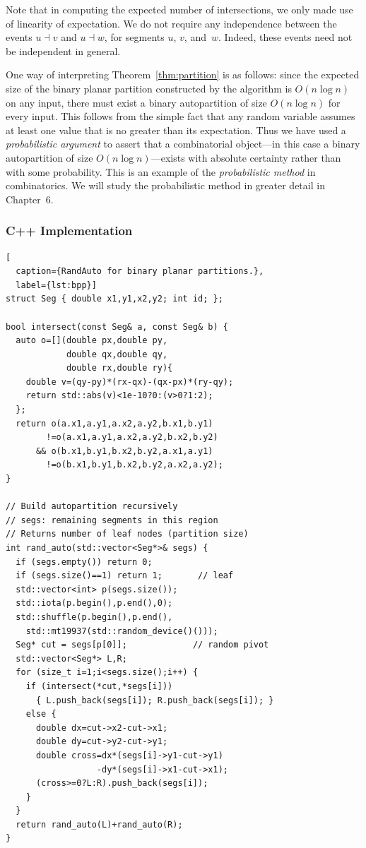 \documentclass[twoside,12pt]{book}
\theoremstyle{plain}
\theoremstyle{definition}
\theoremstyle{remark}
\begin{document}
Note that in computing the expected number of intersections, we only made
use of linearity of expectation.  We do not require any independence between
the events $u\dashv v$ and $u\dashv w$, for segments $u$, $v$, and~$w$.
Indeed, these events need not be independent in general.

One way of interpreting Theorem~\ref{thm:partition} is as follows: since the
expected size of the binary planar partition constructed by the algorithm is
$O(n\log n)$ on any input, there must exist a binary autopartition of size
$O(n\log n)$ for every input.  This follows from the simple fact that any
random variable assumes at least one value that is no greater than its
expectation.  Thus we have used a \emph{probabilistic argument} to assert
that a combinatorial object---in this case a binary autopartition of size
$O(n\log n)$---exists with absolute certainty rather than with some
probability.  This is an example of the \emph{probabilistic method} in
combinatorics.  We will study the probabilistic method in greater detail in
Chapter~6.

\subsubsection*{C++ Implementation}

\begin{lstlisting}[
  caption={RandAuto for binary planar partitions.},
  label={lst:bpp}]
struct Seg { double x1,y1,x2,y2; int id; };

bool intersect(const Seg& a, const Seg& b) {
  auto o=[](double px,double py,
            double qx,double qy,
            double rx,double ry){
    double v=(qy-py)*(rx-qx)-(qx-px)*(ry-qy);
    return std::abs(v)<1e-10?0:(v>0?1:2);
  };
  return o(a.x1,a.y1,a.x2,a.y2,b.x1,b.y1)
        !=o(a.x1,a.y1,a.x2,a.y2,b.x2,b.y2)
      && o(b.x1,b.y1,b.x2,b.y2,a.x1,a.y1)
        !=o(b.x1,b.y1,b.x2,b.y2,a.x2,a.y2);
}

// Build autopartition recursively
// segs: remaining segments in this region
// Returns number of leaf nodes (partition size)
int rand_auto(std::vector<Seg*>& segs) {
  if (segs.empty()) return 0;
  if (segs.size()==1) return 1;       // leaf
  std::vector<int> p(segs.size());
  std::iota(p.begin(),p.end(),0);
  std::shuffle(p.begin(),p.end(),
    std::mt19937(std::random_device()()));
  Seg* cut = segs[p[0]];             // random pivot
  std::vector<Seg*> L,R;
  for (size_t i=1;i<segs.size();i++) {
    if (intersect(*cut,*segs[i]))
      { L.push_back(segs[i]); R.push_back(segs[i]); }
    else {
      double dx=cut->x2-cut->x1;
      double dy=cut->y2-cut->y1;
      double cross=dx*(segs[i]->y1-cut->y1)
                  -dy*(segs[i]->x1-cut->x1);
      (cross>=0?L:R).push_back(segs[i]);
    }
  }
  return rand_auto(L)+rand_auto(R);
}
\end{lstlisting}
\end{document}
